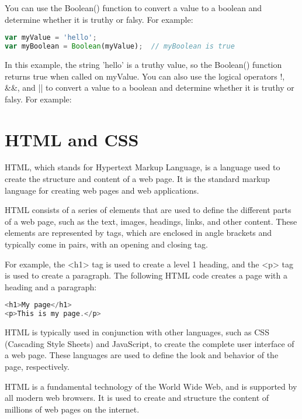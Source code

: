 {You can use the Boolean() function to convert a value to a boolean and determine whether it is truthy or falsy. For example:

\begin{lstlisting}[language=Javascript, nolol]
var myValue = 'hello';
var myBoolean = Boolean(myValue);  // myBoolean is true
\end{lstlisting}

In this example, the string 'hello' is a truthy value, so the Boolean() function returns true when called on myValue. You can also use the logical operators !, \&\&, and || to convert a value to a boolean and determine whether it is truthy or falsy. For example:


\section{HTML and CSS}


HTML, which stands for Hypertext Markup Language, is a language used to create the structure and content of a web page. It is the standard markup language for creating web pages and web applications.

HTML consists of a series of elements that are used to define the different parts of a web page, such as the text, images, headings, links, and other content. These elements are represented by tags, which are enclosed in angle brackets and typically come in pairs, with an opening and closing tag.

For example, the <h1> tag is used to create a level 1 heading, and the <p> tag is used to create a paragraph. The following HTML code creates a page with a heading and a paragraph:

\begin{lstlisting}[language=Javascript, caption=Heading and Paragraph tag]
<h1>My page</h1>
<p>This is my page.</p>
\end{lstlisting}

HTML is typically used in conjunction with other languages, such as CSS (Cascading Style Sheets) and JavaScript, to create the complete user interface of a web page. These languages are used to define the look and behavior of the page, respectively.

HTML is a fundamental technology of the World Wide Web, and is supported by all modern web browsers. It is used to create and structure the content of millions of web pages on the internet.

}
